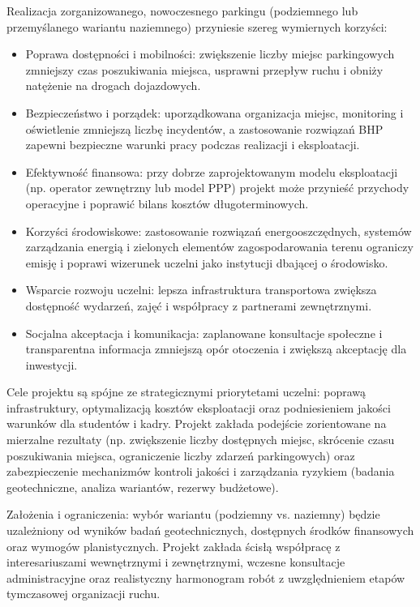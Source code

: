 \documentclass[a4paper,12pt]{article}
\begin{document}
Realizacja zorganizowanego, nowoczesnego parkingu (podziemnego lub przemyślanego wariantu naziemnego) przyniesie szereg wymiernych korzyści:
\begin{itemize}
    \item Poprawa dostępności i mobilności: zwiększenie liczby miejsc parkingowych zmniejszy czas poszukiwania miejsca, usprawni przepływ ruchu i obniży natężenie na drogach dojazdowych.
    \item Bezpieczeństwo i porządek: uporządkowana organizacja miejsc, monitoring i oświetlenie zmniejszą liczbę incydentów, a zastosowanie rozwiązań BHP zapewni bezpieczne warunki pracy podczas realizacji i eksploatacji.
    \item Efektywność finansowa: przy dobrze zaprojektowanym modelu eksploatacji (np. operator zewnętrzny lub model PPP) projekt może przynieść przychody operacyjne i poprawić bilans kosztów długoterminowych.
    \item Korzyści środowiskowe: zastosowanie rozwiązań energooszczędnych, systemów zarządzania energią i zielonych elementów zagospodarowania terenu ograniczy emisję i poprawi wizerunek uczelni jako instytucji dbającej o środowisko.
    \item Wsparcie rozwoju uczelni: lepsza infrastruktura transportowa zwiększa dostępność wydarzeń, zajęć i współpracy z partnerami zewnętrznymi.
    \item Socjalna akceptacja i komunikacja: zaplanowane konsultacje społeczne i transparentna informacja zmniejszą opór otoczenia i zwiększą akceptację dla inwestycji.
\end{itemize}

Cele projektu są spójne ze strategicznymi priorytetami uczelni: poprawą infrastruktury, optymalizacją kosztów eksploatacji oraz podniesieniem jakości warunków dla studentów i kadry. Projekt zakłada podejście zorientowane na mierzalne rezultaty (np. zwiększenie liczby dostępnych miejsc, skrócenie czasu poszukiwania miejsca, ograniczenie liczby zdarzeń parkingowych) oraz zabezpieczenie mechanizmów kontroli jakości i zarządzania ryzykiem (badania geotechniczne, analiza wariantów, rezerwy budżetowe).

Założenia i ograniczenia: wybór wariantu (podziemny vs. naziemny) będzie uzależniony od wyników badań geotechnicznych, dostępnych środków finansowych oraz wymogów planistycznych. Projekt zakłada ścisłą współpracę z interesariuszami wewnętrznymi i zewnętrznymi, wczesne konsultacje administracyjne oraz realistyczny harmonogram robót z uwzględnieniem etapów tymczasowej organizacji ruchu.
\end{document}
